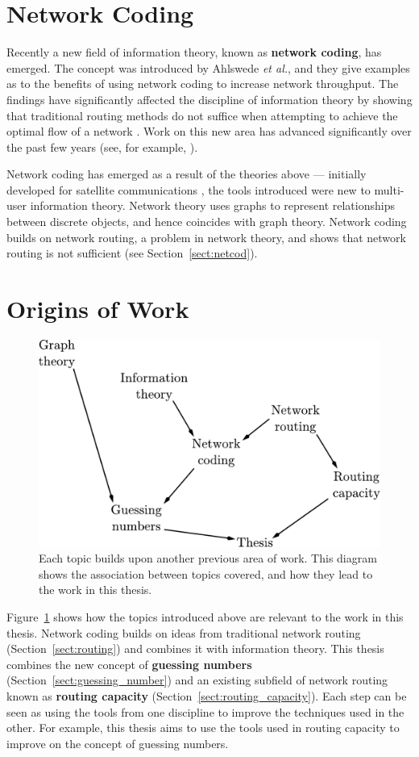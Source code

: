 \section{Network Coding}

Recently a new field of information theory, known as \textbf{network coding}, has emerged. The concept was introduced by Ahlswede \textit{et al.}, and they give examples as to the benefits of using network coding to increase network throughput. The findings have significantly affected the discipline of information theory by showing that traditional routing methods do not suffice when attempting to achieve the optimal flow of a network \cite{ahls2000}. Work on this new area has advanced significantly over the past few years (see, for example, \cite{ahls2000, hoka2003, koet2003, riis2004, doug2005}).

Network coding has emerged as a result of the theories above --- initially developed for satellite communications \cite{yeun1999}, the tools introduced were new to multi-user information theory. Network theory uses graphs to represent relationships between discrete objects, and hence coincides with graph theory. Network coding builds on network routing, a problem in network theory, and shows that network routing is not sufficient (see Section~\ref{sect:netcod}).

\section{Origins of Work}

\begin{figure}[ht]
	\centering
	\includegraphics[width=.6\textwidth]{figures/history.pdf}
	\caption[History of the field and topic association]{Each topic builds upon another previous area of work. This diagram shows the association between topics covered, and how they lead to the work in this thesis.}
	\label{history}
\end{figure}

Figure~\ref{history} shows how the topics introduced above are relevant to the work in this thesis. Network coding builds on ideas from traditional network routing (Section~\ref{sect:routing}) and combines it with information theory. This thesis combines the new concept of \textbf{guessing numbers} \cite{riis2005util, riis2005info} (Section~\ref{sect:guessing_number}) and an existing subfield of network routing known as \textbf{routing capacity} (Section~\ref{sect:routing_capacity}). Each step can be seen as using the tools from one discipline to improve the techniques used in the other. For example, this thesis aims to use the tools used in routing capacity to improve on the concept of guessing numbers.

